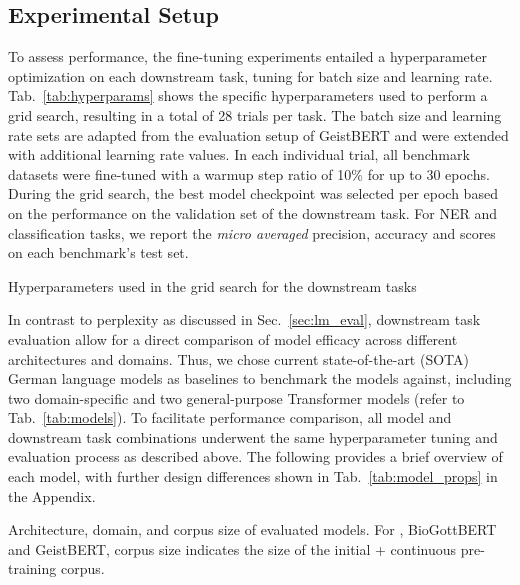 \subsection{Experimental Setup}

To assess performance, the fine-tuning experiments entailed a hyperparameter
optimization on each downstream task, tuning for batch size and learning rate.
Tab.~\ref{tab:hyperparams} shows the specific hyperparameters used to perform a
grid search, resulting in a total of 28 trials per task. The batch size and
learning rate sets are adapted from the evaluation setup of GeistBERT and were
extended with additional learning rate values. In each individual trial, all
benchmark datasets were fine-tuned with a warmup step ratio of 10\% for up to 30
epochs. During the grid search, the best model checkpoint was selected per epoch
based on the performance on the validation set of the downstream task. For NER
and classification tasks, we report the \textit{micro averaged} precision,
accuracy and \ff{} scores on each benchmark's test set. 

\begin{table}[htb]
    \centering
    
    \caption{Hyperparameters used in the grid search for the downstream tasks}
    \label{tab:hyperparams}
\end{table}

In contrast to perplexity as discussed in Sec.~\ref{sec:lm_eval}, downstream
task evaluation allow for a direct comparison of model efficacy across different
architectures and domains. Thus, we chose current state-of-the-art (SOTA) German
language models as baselines to benchmark the \ChristBERT{} models against,
including two domain-specific and two general-purpose Transformer models (refer
to Tab.~\ref{tab:models}). To facilitate performance comparison, all model and
downstream task combinations underwent the same hyperparameter tuning and
evaluation process as described above. The following provides a brief overview
of each model, with further design differences shown in
Tab.~\ref{tab:model_props} in the Appendix.

\begin{table}[htb]
    \centering
    
    \caption[Architecture, domain, and corpus size of evaluated models]{
    Architecture, domain, and corpus size of evaluated models. For \ChristBERT,
    BioGottBERT and GeistBERT, corpus size indicates the size of the initial +
    continuous pre-training corpus.}
    \label{tab:models}
\end{table}

